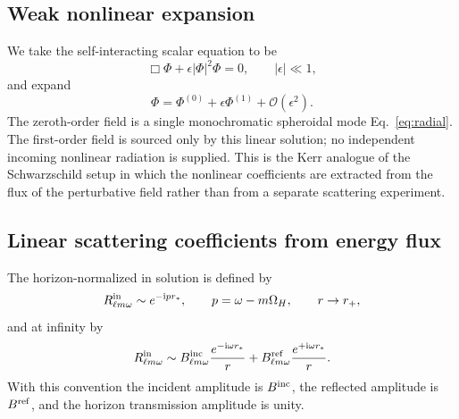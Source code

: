 \documentclass[aps,prd,twocolumn,nofootinbib,superscriptaddress,10pt,floatfix]{revtex4-2}
\newcommand{\ii}{\mathrm{i}}
\newcommand{\calO}{\mathcal{O}}
\newcommand{\rp}{r_+}
\newcommand{\OmH}{\Omega_H}
\newcommand{\Bin}{B^{\rm inc}}
\newcommand{\Bref}{B^{\rm ref}}
\begin{document}
\subsection{Weak nonlinear expansion}

We take the self-interacting scalar equation to be
\begin{equation}
\Box\Phi+\epsilon|\Phi|^2\Phi=0,\qquad |\epsilon|\ll1,
\label{eq:nonlineareq}
\end{equation}
and expand
\begin{equation}
\Phi=\Phi^{(0)}+\epsilon\Phi^{(1)}+\calO(\epsilon^2).
\label{eq:eps_expansion}
\end{equation}
The zeroth-order field is a single monochromatic spheroidal mode
Eq.~\eqref{eq:radial}.  The first-order field is sourced only by this linear
solution; no independent incoming nonlinear radiation is supplied.  This is
the Kerr analogue of the Schwarzschild setup in which the nonlinear
coefficients are extracted from the flux of the perturbative field rather than
from a separate scattering experiment.

\subsection{Linear scattering coefficients from energy flux}

The horizon-normalized in solution is defined by
\begin{equation}
R_{\ell m\omega}^{\rm in}\sim e^{-\ii p r_*},
\qquad p=\omega-m\OmH,\qquad r\rightarrow \rp ,
\end{equation}
and at infinity by
\begin{equation}
R_{\ell m\omega}^{\rm in}\sim
\Bin_{\ell m\omega}\frac{e^{-\ii\omega r_*}}{r}
+
\Bref_{\ell m\omega}\frac{e^{+\ii\omega r_*}}{r}.
\label{eq:linearbc}
\end{equation}
With this convention the incident amplitude is $\Bin$, the reflected amplitude
is $\Bref$, and the horizon transmission amplitude is unity.
\end{document}
